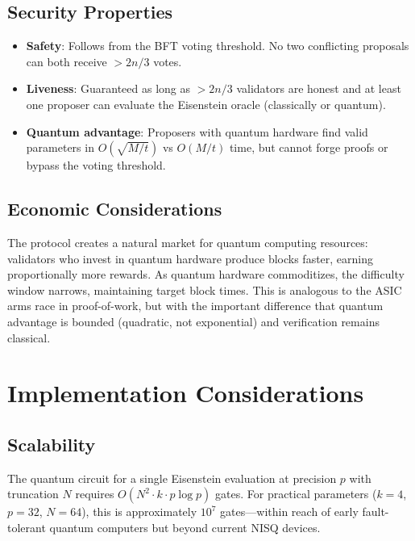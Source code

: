 \documentclass[11pt,a4paper]{article}
\begin{document}
\subsection{Security Properties}

\begin{itemize}[nosep]
  \item \textbf{Safety}: Follows from the BFT voting threshold. No two
        conflicting proposals can both receive $> 2n/3$ votes.
  \item \textbf{Liveness}: Guaranteed as long as $> 2n/3$ validators
        are honest and at least one proposer can evaluate the Eisenstein
        oracle (classically or quantum).
  \item \textbf{Quantum advantage}: Proposers with quantum hardware find
        valid parameters in $O(\sqrt{M/t})$ vs $O(M/t)$ time, but cannot
        forge proofs or bypass the voting threshold.
\end{itemize}

\subsection{Economic Considerations}

The protocol creates a natural market for quantum computing resources:
validators who invest in quantum hardware produce blocks faster,
earning proportionally more rewards. As quantum hardware commoditizes,
the difficulty window narrows, maintaining target block times. This is
analogous to the ASIC arms race in proof-of-work, but with the
important difference that quantum advantage is bounded (quadratic, not
exponential) and verification remains classical.

\section{Implementation Considerations}

\subsection{Scalability}

The quantum circuit for a single Eisenstein evaluation at precision $p$
with truncation $N$ requires $O(N^2 \cdot k \cdot p \log p)$ gates.
For practical parameters ($k=4$, $p=32$, $N=64$), this is approximately
$10^7$ gates---within reach of early fault-tolerant quantum computers
but beyond current NISQ devices.
\end{document}
